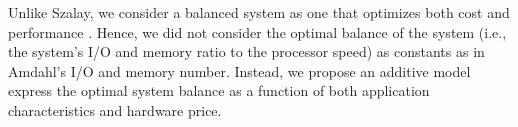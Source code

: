 \documentclass[journal]{IEEEtran}
\begin{document}
Unlike Szalay, we consider a balanced system as one that optimizes both cost and performance \cite{SystemBalance:AMD}. Hence, we did not consider the optimal balance of the system (i.e., the system's I/O and memory ratio to the processor speed) as constants as in Amdahl's I/O and memory number. Instead, we propose an additive model express the optimal system balance  as a function of both application characteristics and hardware price.


\end{document}
